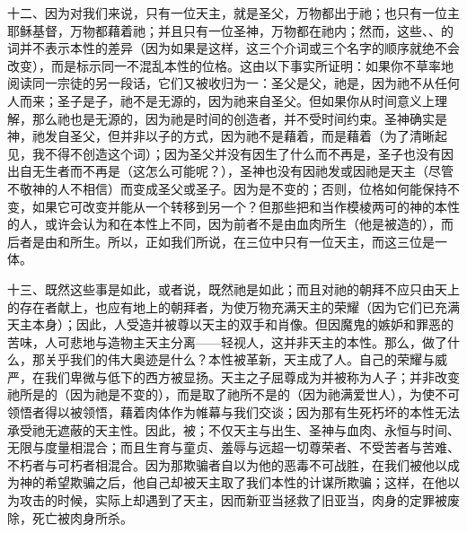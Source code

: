 十二、因为对我们来说，只有一位天主，就是圣父，万物都出于祂；也只有一位主耶稣基督，万物都藉着祂；并且只有一位圣神，万物都在祂内；然而，这些、、的词并不表示本性的差异（因为如果是这样，这三个介词或三个名字的顺序就绝不会改变），而是标示同一不混乱本性的位格。这由以下事实所证明：如果你不草率地阅读同一宗徒的另一段话，它们又被收归为一：圣父是父，祂是，因为祂不从任何人而来；圣子是子，祂不是无源的，因为祂来自圣父。但如果你从时间意义上理解，那么祂也是无源的，因为祂是时间的创造者，并不受时间约束。圣神确实是神，祂发自圣父，但并非以子的方式，因为祂不是藉着，而是藉着（为了清晰起见，我不得不创造这个词）；因为圣父并没有因生了什么而不再是，圣子也没有因出自无生者而不再是（这怎么可能呢？），圣神也没有因祂发或因祂是天主（尽管不敬神的人不相信）而变成圣父或圣子。因为是不变的；否则，位格如何能保持不变，如果它可改变并能从一个转移到另一个？但那些把和当作模棱两可的神的本性的人，或许会认为和在本性上不同，因为前者不是由血肉所生（他是被造的），而后者是由和所生。所以，正如我们所说，在三位中只有一位天主，而这三位是一体。\par

十三、既然这些事是如此，或者说，既然祂是如此；而且对祂的朝拜不应只由天上的存在者献上，也应有地上的朝拜者，为使万物充满天主的荣耀（因为它们已充满天主本身）；因此，人受造并被尊以天主的双手和肖像。但因魔鬼的嫉妒和罪恶的苦味，人可悲地与造物主天主分离——轻视人，这并非天主的本性。那么，做了什么，那关乎我们的伟大奥迹是什么？本性被革新，天主成了人。自己的荣耀与威严，在我们卑微与低下的西方被显扬。天主之子屈尊成为并被称为人子；并非改变祂所是的（因为祂是不变的），而是取了祂所不是的（因为祂满爱世人），为使不可领悟者得以被领悟，藉着肉体作为帷幕与我们交谈；因为那有生死朽坏的本性无法承受祂无遮蔽的天主性。因此，被；不仅天主与出生、圣神与血肉、永恒与时间、无限与度量相混合；而且生育与童贞、羞辱与远超一切尊荣者、不受苦者与苦难、不朽者与可朽者相混合。因为那欺骗者自以为他的恶毒不可战胜，在我们被他以成为神的希望欺骗之后，他自己却被天主取了我们本性的计谋所欺骗；这样，在他以为攻击的时候，实际上却遇到了天主，因而新亚当拯救了旧亚当，肉身的定罪被废除，死亡被肉身所杀。\par

